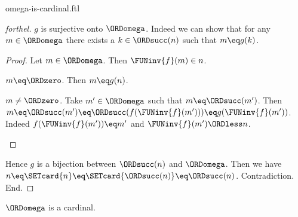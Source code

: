 \documentclass{naproche-library}
\begin{document}
\begin{smodule}[title=$\omega$ is a Cardinal Number]{omega-is-cardinal.ftl}
\begin{proof}[forthel]
    $g$ is surjective onto $\ORDomega$.
    Indeed we can show that for any $m \in \ORDomega$ there exists a $k \in \ORDsucc(n)$ such that $m \eq g(k)$.
    \begin{proof}
      Let $m \in \ORDomega$.
      Then $\FUNinv{f}(m) \in n$.

      \begin{case}{$m \eq \ORDzero$.}
        Then $m \eq g(n)$.
      \end{case}

      \begin{case}{$m \neq \ORDzero$.}
        Take $m' \in \ORDomega$ such that $m \eq \ORDsucc(m')$.
        Then $m
          \eq \ORDsucc(m')
          \eq \ORDsucc(f(\FUNinv{f}(m')))
          \eq g(\FUNinv{f}(m'))$.
        Indeed $f(\FUNinv{f}(m')) \eq m'$ and $\FUNinv{f}(m') \ORDless n$.
      \end{case}
    \end{proof}

    Hence $g$ is a bijection between $\ORDsucc(n)$ and $\ORDomega$.
    Then we have $n
      \eq \SETcard{n}
      \eq \SETcard{\ORDsucc(n)}
      \eq \ORDsucc(n)$.
    Contradiction.
  End.
\end{proof}

\begin{corollary}[forthel,id=SET_THEORY_07_2717623053713408]
  $\ORDomega$ is a cardinal.
\end{corollary}
\end{smodule}
\end{document}
